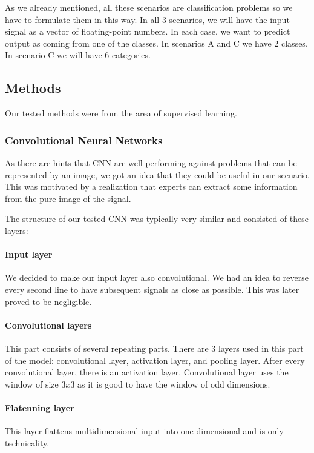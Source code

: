 As we already mentioned, all these scenarios are classification problems so we have
to formulate them in this way. In all 3 scenarios, we will have the input signal as a
vector of floating-point numbers. In each case, we want to predict output as coming
from one of the classes. In scenarios A and C we have 2 classes. In scenario C we
will have 6 categories.

\subsection{Methods}

Our tested methods were from the area of supervised learning.

\subsubsection{Convolutional Neural Networks}

As there are hints that CNN are well-performing against problems that can be
represented by an image, we got an idea that they could be useful in our scenario.
This was motivated by a realization that experts can extract some information from
the pure image of the signal.

The structure of our tested CNN was typically very similar and consisted of these
layers:

\paragraph{Input layer}
We decided to make our input layer also convolutional. We had an idea to reverse
every second line to have subsequent signals as close as possible. This was later
proved to be negligible.

\paragraph{Convolutional layers}
This part consists of several repeating parts. There are 3 layers used in
this part of the model: convolutional layer, activation layer, and pooling layer.
After every convolutional layer, there is an activation layer. Convolutional layer uses
the window of size $3x3$ as it is good to have the window of odd dimensions.

\paragraph{Flatenning layer}
This layer flattens multidimensional input into one dimensional and is only technicality.

